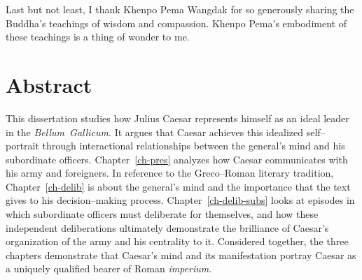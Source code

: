 \documentclass[12pt,letterpaper,oneside,final]{memoir}
\begin{document}
Last but not least, I thank Khenpo Pema Wangdak for so generously sharing the Buddha's teachings of wisdom and compassion. Khenpo Pema's embodiment of these teachings is a thing of wonder to me.


\newpage

\chapter{Abstract}
\DoubleSpacing

This dissertation studies how Julius Caesar represents himself as an ideal leader in the \emph{Bellum~Gallicum}. It argues that Caesar achieves this idealized self--portrait through interactional relationships between the general's mind and his subordinate officers. Chapter~\ref{ch-pres} analyzes how Caesar communicates with his army and foreigners. In reference to the Greco--Roman literary tradition, Chapter~\ref{ch-delib} is about the general's mind and the importance that the text gives to his decision--making process. Chapter~\ref{ch-delib-subs} looks at episodes in which subordinate officers must deliberate for themselves, and how these independent deliberations ultimately demonstrate the brilliance of Caesar's organization of the army and his centrality to it. Considered together, the three chapters demonstrate that Caesar's mind and its manifestation portray Caesar as a uniquely qualified bearer of Roman \emph{imperium}.

\newpage
\renewcommand*{\cftappendixname}{Appendix\space}
\renewcommand*{\contentsname}{Table of contents}
\setcounter{tocdepth}{2}%
\begin{KeepFromToc}
\tableofcontents
\end{KeepFromToc}
\clearpage
\newpage
\clearpage
\end{document}
